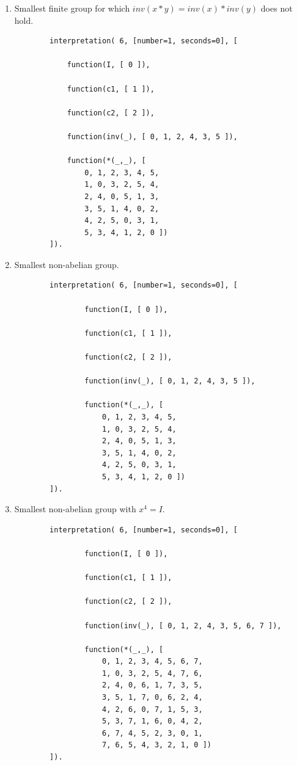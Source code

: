 \documentclass{scrartcl}
\begin{document}
\begin{enumerate}[label=\alph*)]
	\item
		Smallest finite group for which $inv(x*y)=inv(x)*inv(y)$ does not hold.
		\begin{verbatim}
		interpretation( 6, [number=1, seconds=0], [

		    function(I, [ 0 ]),

		    function(c1, [ 1 ]),

		    function(c2, [ 2 ]),

		    function(inv(_), [ 0, 1, 2, 4, 3, 5 ]),

		    function(*(_,_), [
		        0, 1, 2, 3, 4, 5,
		        1, 0, 3, 2, 5, 4,
		        2, 4, 0, 5, 1, 3,
		        3, 5, 1, 4, 0, 2,
		        4, 2, 5, 0, 3, 1,
		        5, 3, 4, 1, 2, 0 ])
		]).
		\end{verbatim}

	\item
		Smallest non-abelian group.
		\begin{verbatim}
		interpretation( 6, [number=1, seconds=0], [

			    function(I, [ 0 ]),

			    function(c1, [ 1 ]),

			    function(c2, [ 2 ]),

			    function(inv(_), [ 0, 1, 2, 4, 3, 5 ]),

			    function(*(_,_), [
			        0, 1, 2, 3, 4, 5,
			        1, 0, 3, 2, 5, 4,
			        2, 4, 0, 5, 1, 3,
			        3, 5, 1, 4, 0, 2,
			        4, 2, 5, 0, 3, 1,
			        5, 3, 4, 1, 2, 0 ])
		]).
		\end{verbatim}

	\item
		\pagebreak
		Smallest non-abelian group with $x^4 = I$.
		\begin{verbatim}
		interpretation( 6, [number=1, seconds=0], [

			    function(I, [ 0 ]),

			    function(c1, [ 1 ]),

			    function(c2, [ 2 ]),

			    function(inv(_), [ 0, 1, 2, 4, 3, 5, 6, 7 ]),

			    function(*(_,_), [
			        0, 1, 2, 3, 4, 5, 6, 7,
			        1, 0, 3, 2, 5, 4, 7, 6,
			        2, 4, 0, 6, 1, 7, 3, 5,
			        3, 5, 1, 7, 0, 6, 2, 4,
			        4, 2, 6, 0, 7, 1, 5, 3,
			        5, 3, 7, 1, 6, 0, 4, 2,
			        6, 7, 4, 5, 2, 3, 0, 1,
			        7, 6, 5, 4, 3, 2, 1, 0 ])
		]).
		\end{verbatim}
\end{enumerate}
\end{document}
